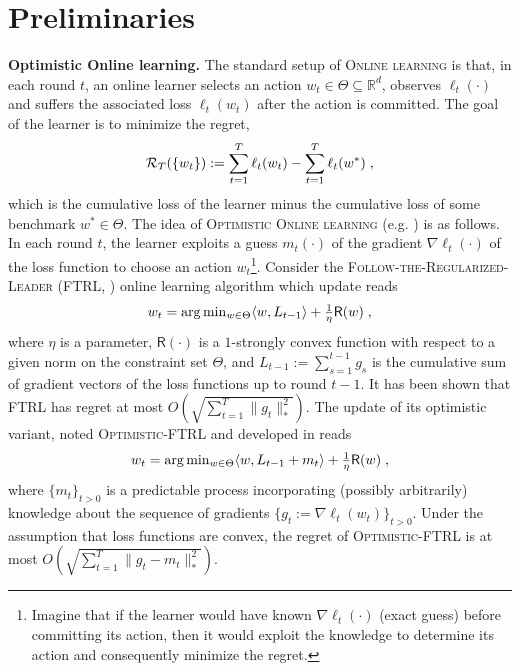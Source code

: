\documentclass[11pt]{article}
\theoremstyle{k}
\begin{document}
\section{Preliminaries}\label{sec:prelim}
\textbf{Optimistic Online learning.}\hspace{0.1cm}
The standard setup of \textsc{Online learning} is that, in each round $t$, an online learner selects an action $w_{t} \in \Theta \subseteq \mathbb R^{d}$, observes $\ell_{t}(\cdot)$ and suffers the associated loss $\ell_{t}(w_t)$ after the action is committed.
The goal of the learner is to minimize the regret, 
$$\mathcal{R}_{T}( \{ w_t \} ):= \sum_{t=1}^T \ell_{t}(w_t) - \sum_{t=1}^T \ell_{t}(w^*)\;,$$
which is the cumulative loss of the learner minus the cumulative loss of some benchmark $w^{*} \in \Theta$.
The idea of \textsc{Optimistic Online learning} (e.g. \citep{CJ12,rakhlin2013online,SALS15,ALLW18}) is as follows.
In each round $t$, the learner exploits a guess $m_t(\cdot)$ of the gradient $\nabla \ell_t(\cdot)$ of the loss function to choose an action $w_t$\footnote{Imagine that if the learner would have known $\nabla \ell_t(\cdot)$ (\ie exact guess) before committing its action, then it would exploit the knowledge to determine its action and consequently minimize the regret.}. 
Consider the \textsc{Follow-the-Regularized-Leader} (\textsc{FTRL}, \citep{H14}) online learning algorithm which update reads
\begin{equation} \label{optFTRL}
\textstyle w_t  = \arg \min_{w \in \Theta} \langle w , L_{t-1} \rangle + \frac{1}{\eta} \textsf{R}(w) \;,
\end{equation}
where $\eta$ is a parameter, $\textsf{R}(\cdot)$ is a $1$-strongly convex function with respect to a given norm on the constraint set $\Theta$, and $L_{t-1}:= \sum_{s=1}^{t-1} g_s$ is the cumulative sum of gradient vectors of the loss functions up to round $t-1$. It has been shown that FTRL has regret at most $O(\sqrt{\sum_{t=1}^T \| g_t \|_*^2})$.
The update of its optimistic variant, noted \textsc{Optimistic-FTRL} and developed in \citep{SALS15} reads
\begin{equation} \label{optFTRL}
\textstyle w_t  = \arg \min_{w \in \Theta} \langle w , L_{t-1} + m_t \rangle + \frac{1}{\eta} \textsf{R}(w)\;,
\end{equation}
where $\{m_{t}\}_{t>0}$ is a predictable process incorporating (possibly arbitrarily) knowledge about the sequence of gradients $\{ g_{t}:=\nabla \ell_t(w_t)\}_{t>0}$.
Under the assumption that loss functions are convex, the regret of \textsc{Optimistic-FTRL} is at most $O(\sqrt{\sum_{t=1}^T \| g_t - m_t \|_*^2 } )$.
\end{document}
